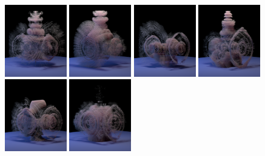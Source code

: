 \documentclass[11pt]{article}
\begin{document}
\begin{figure}
	\includegraphics[width=0.24\textwidth]{Figures/modes/plume0006.png}
	\includegraphics[width=0.24\textwidth]{Figures/modes/plume0007.png}
	\includegraphics[width=0.24\textwidth]{Figures/modes/plume0008.png}
	\includegraphics[width=0.24\textwidth]{Figures/modes/plume0009.png}
	\includegraphics[width=0.24\textwidth]{Figures/modes/plume0010.png}
	\includegraphics[width=0.24\textwidth]{Figures/modes/plume0011.png}

\end{figure}
\end{document}
